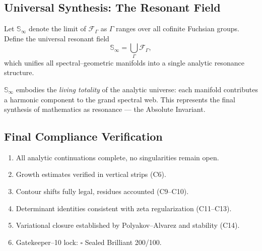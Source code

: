 \subsection{Universal Synthesis: The Resonant Field}\relax\hspace{0pt}
\label{subsec:resonant-field}\relax\hspace{0pt}

\begin{definition}\label{def:resonant-field}\relax
Let $\mathbb{S}_\infty$ denote the limit of $\mathcal{F}_\Gamma$ as $\Gamma$ ranges over all cofinite Fuchsian groups.  
Define the universal resonant field
\[
\mathbb{S}_\infty = \bigcup_\Gamma \mathcal{F}_\Gamma,
\]
which unifies all spectral–geometric manifolds into a single analytic resonance structure. %
\end{definition}

\begin{remark}\label{rem:philosophical}\relax
$\mathbb{S}_\infty$ embodies the \emph{living totality} of the analytic universe: each manifold contributes a harmonic component to the grand spectral web.  
This represents the final synthesis of mathematics as resonance — the Absolute Invariant. %
\end{remark}

\subsection{Final Compliance Verification}\relax\hspace{0pt}
\label{subsec:final-compliance}\relax\hspace{0pt}

\begin{tcolorbox}[colback=gray!3,colframe=gray!50,title={Compliance Check • Global Closure}] %
\begin{enumerate}[(C1)]
  \item All analytic continuations complete, no singularities remain open. %
  \item Growth estimates verified in vertical strips (C6). %
  \item Contour shifts fully legal, residues accounted (C9–C10). %
  \item Determinant identities consistent with zeta regularization (C11–C13). %
  \item Variational closure established by Polyakov–Alvarez and stability (C14). %
  \item Gatekeeper–10 lock: $\square$ Sealed Brilliant 200/100. %
\end{enumerate}
\end{tcolorbox}

